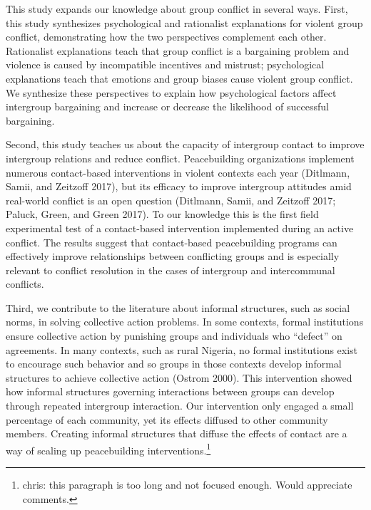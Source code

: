 \documentclass[11pt]{article}
\begin{document}
This study expands our knowledge about group conflict in several ways.
First, this study synthesizes psychological and rationalist explanations
for violent group conflict, demonstrating how the two perspectives
complement each other. Rationalist explanations teach that group
conflict is a bargaining problem and violence is caused by incompatible
incentives and mistrust; psychological explanations teach that emotions
and group biases cause violent group conflict. We synthesize these
perspectives to explain how psychological factors affect intergroup
bargaining and increase or decrease the likelihood of successful
bargaining.

Second, this study teaches us about the capacity of intergroup contact
to improve intergroup relations and reduce conflict. Peacebuilding
organizations implement numerous contact-based interventions in violent
contexts each year (Ditlmann, Samii, and Zeitzoff 2017), but its
efficacy to improve intergroup attitudes amid real-world conflict is an
open question (Ditlmann, Samii, and Zeitzoff 2017; Paluck, Green, and
Green 2017). To our knowledge this is the first field experimental test
of a contact-based intervention implemented during an active conflict.
The results suggest that contact-based peacebuilding programs can
effectively improve relationships between conflicting groups and is
especially relevant to conflict resolution in the cases of intergroup
and intercommunal conflicts.

Third, we contribute to the literature about informal structures, such
as social norms, in solving collective action problems. In some
contexts, formal institutions ensure collective action by punishing
groups and individuals who ``defect'' on agreements. In many contexts,
such as rural Nigeria, no formal institutions exist to encourage such
behavior and so groups in those contexts develop informal structures to
achieve collective action (Ostrom 2000). This intervention showed how
informal structures governing interactions between groups can develop
through repeated intergroup interaction. Our intervention only engaged a
small percentage of each community, yet its effects diffused to other
community members. Creating informal structures that diffuse the effects
of contact are a way of scaling up peacebuilding
interventions.\footnote{chris: this paragraph is too long and not
  focused enough. Would appreciate comments.}
\end{document}

